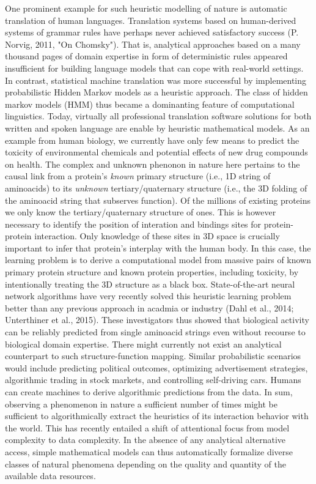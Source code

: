 \documentclass[authoryear,review,3p]{elsarticle}
\begin{document}
One prominent example for such heuristic modelling of nature is
automatic translation of human languages.
Translation systems based on 
human-derived systems of grammar rules have perhaps never achieved
satisfactory success (P. Norvig, 2011, "On Chomsky").
That is, analytical approaches based on
a many thousand pages of domain expertise in form of
deterministic rules appeared insufficient for building
language models that can cope with real-world settings.
%
In contrast, statistical machine translation was more successful
by implementing probabilistic Hidden Markov models
as a heuristic approach.
The class of hidden markov models (HMM)
thus became a dominanting feature
of computational linguistics.
%
Today, virtually all professional translation software solutions
for both written and spoken language
are enable by heuristic mathematical models.
%
%
%
As an example from human biology,
we currently have only few means to predict the
toxicity of environmental chemicals and
potential effects of new drug compounds on health.
%
The complex and unknown phenonon in nature here pertains
to the causal link from
a protein's \textit{known} primary structure
(i.e., 1D string of aminoacids)
to
its \textit{unknown} tertiary/quaternary structure
(i.e., the 3D folding of the aminoacid string that subserves function).
%
Of the millions of existing proteins
we only know the tertiary/quaternary structure of
 ones.
This is however necessary to identify the position of
interation and bindings sites
for protein-protein interaction.
Only knowledge of these sites in 3D space is crucially important
to infer that protein's interplay with the human body.
%
In this case,
the learning problem is to
derive a computational model from
massive pairs of known primary protein structure and
known protein properties, including toxicity,
by intentionally treating the 3D structure
as a black box.
%
State-of-the-art neural network algorithms
have very recently solved this heuristic learning problem
better than any previous approach in acadmia or industry
(Dahl et al., 2014; Unterthiner et al., 2015).
These investigators thus showed that biological activity
can be reliably predicted from single aminoacid strings
even without recourse to biological domain expertise.
%
There might currently not exist
an analytical counterpart to such
structure-function mapping.
%
%
Similar probabilistic scenarios would include predicting
political outcomes,
optimizing advertisement strategies,
algorithmic trading in stock markets, and
controlling self-driving cars.
Humans can create machines to derive
algorithmic predictions from the data.
%
%
In sum,
observing a phenomenon in nature a sufficient number of times
might be sufficient to
algorithmically extract
the heuristics of its interaction behavior with the world.
This has recently entailed a shift
of attentional focus from model complexity to data complexity.
In the absence of any analytical alternative access,
simple mathematical models can thus automatically
formalize diverse classes of natural phenomena
depending on the quality and quantity of
the available data resources.
\end{document}
